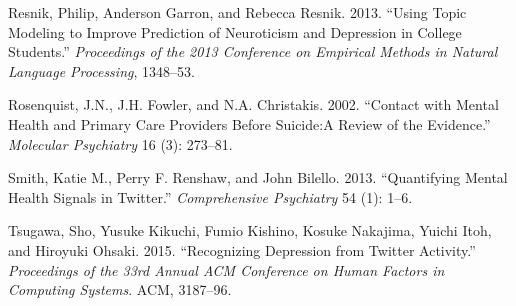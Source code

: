 \documentclass[]{article}
\begin{document}
\leavevmode\hypertarget{ref-Resnik2013}{}%
Resnik, Philip, Anderson Garron, and Rebecca Resnik. 2013. ``Using Topic
Modeling to Improve Prediction of Neuroticism and Depression in College
Students.'' \emph{Proceedings of the 2013 Conference on Empirical
Methods in Natural Language Processing}, 1348--53.

\leavevmode\hypertarget{ref-Rosenquist2011}{}%
Rosenquist, J.N., J.H. Fowler, and N.A. Christakis. 2002. ``Contact with
Mental Health and Primary Care Providers Before Suicide:A Review of the
Evidence.'' \emph{Molecular Psychiatry} 16 (3): 273--81.

\leavevmode\hypertarget{ref-Smith2013}{}%
Smith, Katie M., Perry F. Renshaw, and John Bilello. 2013. ``Quantifying
Mental Health Signals in Twitter.'' \emph{Comprehensive Psychiatry} 54
(1): 1--6.

\leavevmode\hypertarget{ref-Tsugawa2015}{}%
Tsugawa, Sho, Yusuke Kikuchi, Fumio Kishino, Kosuke Nakajima, Yuichi
Itoh, and Hiroyuki Ohsaki. 2015. ``Recognizing Depression from Twitter
Activity.'' \emph{Proceedings of the 33rd Annual ACM Conference on Human
Factors in Computing Systems}. ACM, 3187--96.
\end{document}
